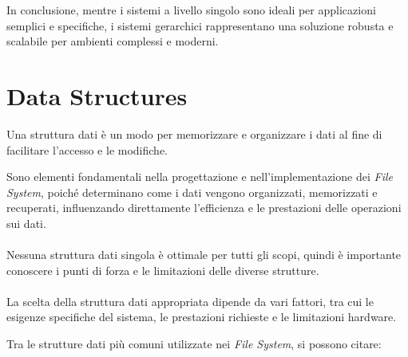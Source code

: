 \documentclass[12pt,a4paper,openright,twoside]{book}
\begin{document}
        In conclusione, mentre i sistemi a livello singolo sono ideali per applicazioni semplici e specifiche, i sistemi gerarchici rappresentano una soluzione robusta e scalabile per ambienti complessi e moderni. \cite{tanenbaum2015modern}

    \section{Data Structures}

        Una struttura dati è un modo per memorizzare e organizzare i dati al fine di facilitare l'accesso e le modifiche.

        Sono elementi fondamentali nella progettazione e nell'implementazione dei \textit{File System}, poiché determinano come i dati vengono organizzati, memorizzati e recuperati, influenzando direttamente l'efficienza e le prestazioni delle operazioni sui dati.

        \paragraph*{}

        Nessuna struttura dati singola è ottimale per tutti gli scopi, quindi è importante conoscere i punti di forza e le limitazioni delle diverse strutture.

        \paragraph*{}

        La scelta della struttura dati appropriata dipende da vari fattori, tra cui le esigenze specifiche del sistema, le prestazioni richieste e le limitazioni hardware.

        Tra le strutture dati più comuni utilizzate nei \textit{File System}, si possono citare:
\end{document}

